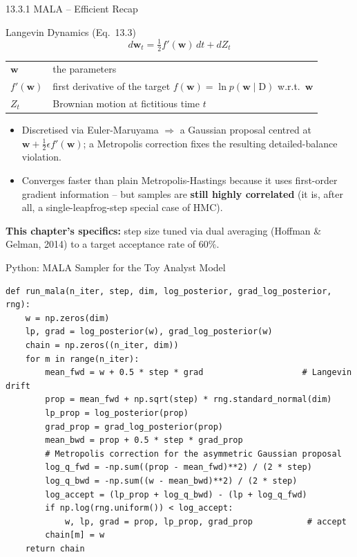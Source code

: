 \documentclass[aspectratio=169,10pt]{beamer}
\newcommand{\w}{\mathbf{w}}
\newcommand{\Data}{\mathrm{D}}
\begin{document}
\begin{frame}{13.3.1 \; MALA -- Efficient Recap}
  \begin{block}{Langevin Dynamics (Eq.~13.3)}
    \[
      d\w_t = \tfrac12 f'(\w)\,dt + dZ_t
    \]
    \begin{tabular}{ll}
      $\w$    & the parameters\\
      $f'(\w)$ & first derivative of the target $f(\w)=\ln p(\w\mid\Data)$ w.r.t.\ $\w$\\
      $Z_t$    & Brownian motion at fictitious time $t$\\
    \end{tabular}
  \end{block}
  \begin{itemize}
    \item Discretised via Euler-Maruyama $\Rightarrow$ a Gaussian proposal
          centred at $\w+\tfrac12\epsilon f'(\w)$; a Metropolis correction
          fixes the resulting detailed-balance violation.
    \item Converges faster than plain Metropolis-Hastings because it uses
          first-order gradient information -- but samples are \textbf{still
          highly correlated} (it is, after all, a single-leapfrog-step
          special case of HMC).
  \end{itemize}
  \vspace{4pt}
  \textbf{This chapter's specifics:} step size tuned via dual averaging
  (Hoffman \& Gelman, 2014) to a target acceptance rate of $60\%$.
\end{frame}

\begin{frame}[fragile]{Python: MALA Sampler for the Toy Analyst Model}
\begin{lstlisting}[caption={From-scratch MALA (Eq. 13.3 + Metropolis correction) on the toy BLR-ARD posterior}]
def run_mala(n_iter, step, dim, log_posterior, grad_log_posterior, rng):
    w = np.zeros(dim)
    lp, grad = log_posterior(w), grad_log_posterior(w)
    chain = np.zeros((n_iter, dim))
    for m in range(n_iter):
        mean_fwd = w + 0.5 * step * grad                    # Langevin drift
        prop = mean_fwd + np.sqrt(step) * rng.standard_normal(dim)
        lp_prop = log_posterior(prop)
        grad_prop = grad_log_posterior(prop)
        mean_bwd = prop + 0.5 * step * grad_prop
        # Metropolis correction for the asymmetric Gaussian proposal
        log_q_fwd = -np.sum((prop - mean_fwd)**2) / (2 * step)
        log_q_bwd = -np.sum((w - mean_bwd)**2) / (2 * step)
        log_accept = (lp_prop + log_q_bwd) - (lp + log_q_fwd)
        if np.log(rng.uniform()) < log_accept:
            w, lp, grad = prop, lp_prop, grad_prop           # accept
        chain[m] = w
    return chain
\end{lstlisting}
\end{frame}
\end{document}
